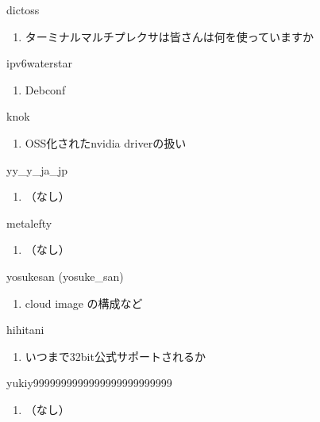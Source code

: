 \begin{prework}{ dictoss }
  \begin{enumerate}
  \item ターミナルマルチプレクサは皆さんは何を使っていますか
  \end{enumerate}
\end{prework}

\begin{prework}{ ipv6waterstar }
  \begin{enumerate}
  \item Debconf
  \end{enumerate}
\end{prework}

\begin{prework}{ knok }
  \begin{enumerate}
  \item OSS化されたnvidia driverの扱い
  \end{enumerate}
\end{prework}

\begin{prework}{ yy\_y\_ja\_jp }
  \begin{enumerate}
  \item （なし）
  \end{enumerate}
\end{prework}

\begin{prework}{ metalefty }
  \begin{enumerate}
  \item （なし）
  \end{enumerate}
\end{prework}

\begin{prework}{ yosukesan (yosuke\_san) }
  \begin{enumerate}
  \item cloud image の構成など
  \end{enumerate}
\end{prework}

\begin{prework}{ hihitani }
  \begin{enumerate}
  \item いつまで32bit公式サポートされるか
  \end{enumerate}
\end{prework}

\begin{prework}{ yukiy9999999999999999999999999 }
  \begin{enumerate}
  \item （なし）
  \end{enumerate}
\end{prework}
